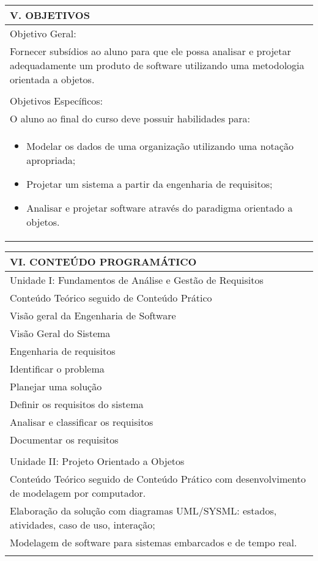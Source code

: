 \documentclass[12pt]{article}
\begin{document}
\begin{longtable}{|L{1.025\textwidth}|} \hline
%
{\bf V. OBJETIVOS } \\ \hline
%
Objetivo Geral:\\

Fornecer subsídios ao aluno para que ele possa analisar e projetar adequadamente um produto de software utilizando uma metodologia orientada a objetos.\\
 \\
Objetivos Específicos:\\
O aluno ao final do curso deve possuir habilidades para:\\
\begin{itemize}
\item Modelar os dados de uma organização utilizando uma notação apropriada;
\item Projetar um sistema a partir da engenharia de requisitos;
\item Analisar e projetar software através do paradigma orientado a objetos.
\end{itemize}

\\ \hline
\end{longtable}


\begin{longtable}{|L{1.025\textwidth}|} \hline
%
{\bf VI. CONTEÚDO PROGRAMÁTICO } \\ \hline
Unidade I: Fundamentos de Análise e Gestão de Requisitos\\
Conteúdo Teórico seguido de Conteúdo Prático \\
Visão geral da Engenharia de Software \\
Visão Geral do Sistema\\
Engenharia de requisitos\\
Identificar o problema \\
Planejar uma solução\\
Definir os requisitos do sistema\\
Analisar e classificar os requisitos\\
Documentar os requisitos\\
\\
Unidade II: Projeto Orientado a Objetos\\
Conteúdo Teórico seguido de Conteúdo Prático com desenvolvimento de modelagem por computador. \\
Elaboração da solução com diagramas UML/SYSML: estados, atividades, caso de uso, interação;\\
Modelagem de software para sistemas embarcados e de tempo real.\\

\\ \hline
\end{longtable} 
\end{document}
